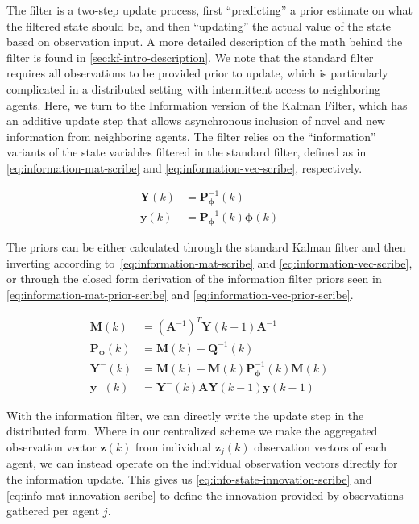 The filter is a two-step update process, first ``predicting'' a prior estimate on what the filtered state should be, and then ``updating'' the actual value of the state based on observation input. A more detailed description of the math behind the filter is found in \ref{sec:kf-intro-description}. We note that the standard filter requires all observations to be provided prior to update, which is particularly complicated in a distributed setting with intermittent access to neighboring agents. Here, we turn to the Information version of the Kalman Filter, which has an additive update step that allows asynchronous inclusion of novel and new information from neighboring agents. The filter relies on the ``information'' variants of the state variables filtered in the standard filter, defined as in \eqref{eq:information-mat-scribe} and \eqref{eq:information-vec-scribe}, respectively.

\begin{align}
    \mathbf{Y}(k) &= \mathbf{P}_{\bm{\phi}}^{-1}(k) \label{eq:information-mat-scribe} \\
    \mathbf{y}(k) &= \mathbf{P}_{\bm{\phi}}^{-1}(k)\bm{\phi}(k)
    \label{eq:information-vec-scribe}
\end{align}

The priors can be either calculated through the standard Kalman filter and then inverting according to~\eqref{eq:information-mat-scribe} and \eqref{eq:information-vec-scribe}, or through the closed form derivation of the information filter priors seen in \eqref{eq:information-mat-prior-scribe} and \eqref{eq:information-vec-prior-scribe}.

\begin{align}
    \mathbf{M}(k) &= \left(\mathbf{A}^{-1}\right)^T\mathbf{Y}(k-1)\mathbf{A}^{-1} \\
    \mathbf{P}_{\bm{\phi}}(k) &= \mathbf{M}(k) + \mathbf{Q}^{-1}(k) \\
    \mathbf{Y}^{-}(k) &= \mathbf{M}(k) - \mathbf{M}(k)\mathbf{P}_{\bm{\phi}}^{-1}(k)\mathbf{M}(k) \label{eq:information-mat-prior-scribe} \\
    \mathbf{y}^{-}(k) &= \mathbf{Y}^{-}(k)\mathbf{A}\mathbf{Y}(k-1)\mathbf{y}(k-1)
    \label{eq:information-vec-prior-scribe}
\end{align}

With the information filter, we can directly write the update step in the distributed form. Where in our centralized scheme we make the aggregated observation vector $\mathbf{z}(k)$ from individual $\mathbf{z}_j(k)$ observation vectors of each agent, we can instead operate on the individual observation vectors directly for the information update. This gives us \eqref{eq:info-state-innovation-scribe} and \eqref{eq:info-mat-innovation-scribe} to define the innovation provided by observations gathered per agent $j$.

